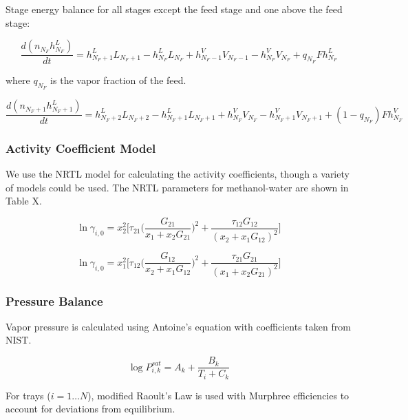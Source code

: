 Stage energy balance for all stages except the feed stage and  one above the feed stage:

\begin{equation}
    \frac{d(n_{N_F}h^L_{N_F})}{dt} = h^L_{N_F+1}L_{N_F+1}-h^L_{N_F}L_{N_F} + h^V_{N_F-1}V_{N_F-1}-h^V_{N_F}V_{N_F} + q_{N_F}F h^L_{N_F}
\end{equation}

where $q_{N_F}$ is the vapor fraction of the feed.

\begin{equation}
    \frac{d(n_{N_F+1}h^L_{N_F+1})}{dt} = h^L_{N_F+2}L_{N_F+2}-h^L_{N_F+1}L_{N_F+1} +h^V_{N_F} V_{N_F}-h^V_{N_F+1} V_{N_F+1} + (1-q_{N_F})Fh^V_{N_F}
\end{equation}


\subsubsection{Activity Coefficient Model}

We use the NRTL model for calculating the activity coefficients, though a variety of models could be used. The NRTL parameters for methanol-water are shown in Table X.

\begin{equation}
    \ln \gamma_{i,0} = x_2^2\biggl [\tau_{21} \biggl (\frac{G_{21}}{x_1+x_2G_{21}}\biggr)^2 + \frac{\tau_{12}G_{12}}{(x_2 + x_1 G_{12})^2} \biggr ]
\end{equation}

\begin{equation}
     \ln \gamma_{i,0} = x_1^2\biggl [\tau_{12} \biggl (\frac{G_{12}}{x_2+x_1G_{12}}\biggr)^2 + \frac{\tau_{21}G_{21}}{(x_1 + x_2 G_{21})^2} \biggr ]   
\end{equation}

\subsubsection{Pressure Balance}

Vapor pressure is calculated using Antoine’s equation with coefficients taken from NIST. 

\begin{equation}
    \log P_{i,k}^{sat} = A_k + \frac{B_k}{T_i + C_k}
\end{equation}

For trays ($i=1\dots N$), modified Raoult’s Law is used with Murphree efficiencies to account for deviations from equilibrium.

